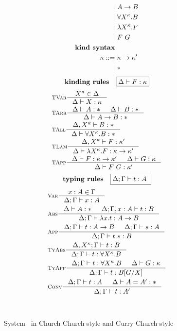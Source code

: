 \begin{figure}
\begin{singlespace}
\begin{minipage}{.46\textwidth}
\begin{align*}
          | &~ A -> B             \\
          | &~ \forall X^\kappa.B \\
          | &~ \lambda X^\kappa.F      \\
          | &~ F ~ G              \\
\textbf{kind syntax} \\
\kappa ::= &~ \kappa -> \kappa' \\
         | &~ *                 \\
\end{align*}
\[ \textbf{kinding rules} \quad \framebox{$ \Delta |- F:\kappa$}\]\vspace*{-1em}
\begin{align*}
& \inference[\sc TVar]{X^\kappa \in \Delta}{\Delta |- X:\kappa} \\
& \inference[\sc TArr]{\Delta |- A:* & \Delta |- B:*}{\Delta |- A -> B:*} \\
& \inference[\sc TAll]{\Delta,X^\kappa |- B:*}{\Delta |- \forall X^\kappa.B:*} \\
& \inference[\sc TLam]{\Delta,X^\kappa |- F:\kappa'}
                      {\Delta |- \l X^\kappa.F:\kappa -> \kappa'} \\
& \inference[\sc TApp]{\Delta |- F : \kappa -> \kappa' & \Delta |- G : \kappa}
                      {\Delta |- F ~ G : \kappa'} \\
\end{align*}
\[ \textbf{typing rules} \quad \framebox{$ \Delta;\Gamma |- t : A $ } \]
\vspace*{-1em}
\begin{align*}
& \inference[\sc Var]{x:A \in \Gamma}{\Delta;\Gamma |- x:A} \\
& \inference[\sc Abs]{\Delta |- A:* & \Delta;\Gamma,x:A |- t : B}
                     {\Delta;\Gamma |- \l x   .t : A -> B} \\
& \inference[\sc App]{\Delta;\Gamma |- t : A -> B & \Delta;\Gamma |- s : A}
                     {\Delta;\Gamma |- t~s : B} \\
& \inference[\sc TyAbs]{\Delta,X^\kappa;\Gamma |- t : B}
                       {\Delta;\Gamma |- t : \forall X^\kappa.B} \\
& \inference[\sc TyApp]{\Delta;\Gamma |- t : \forall X^\kappa.B & \Delta |- G:\kappa}
                       {\Delta;\Gamma |- t : B[G/X]} \\
& \inference[\sc Conv]{\Delta;\Gamma |- t : A & \Delta |- A = A' : *}
                      {\Delta;\Gamma |- t : A'}
\end{align*}
\end{minipage}
~\\
\caption{System \Fw\ in Church-Church-style and Curry-Church-style}
\label{fig:fw}
\end{singlespace}
\end{figure}

